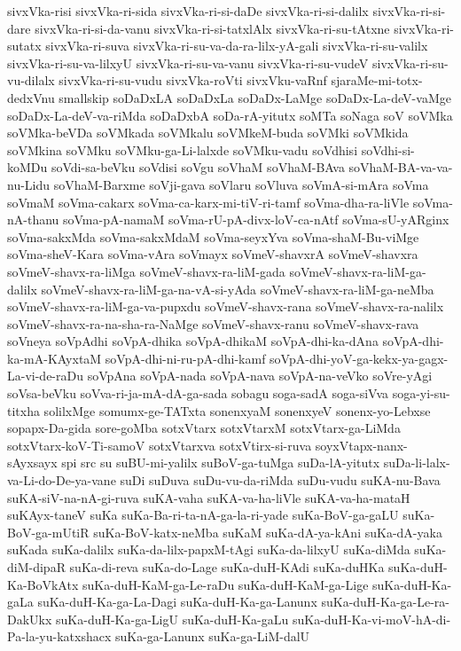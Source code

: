 {sivxVka-risi
sivxVka-ri-sida
sivxVka-ri-si-daDe
sivxVka-ri-si-dalilx
sivxVka-ri-si-dare
sivxVka-ri-si-da-vanu
sivxVka-ri-si-tatxlAlx
sivxVka-ri-su-tAtxne
sivxVka-ri-sutatx
sivxVka-ri-suva
sivxVka-ri-su-va-da-ra-lilx-yA-gali
sivxVka-ri-su-valilx
sivxVka-ri-su-va-lilxyU
sivxVka-ri-su-va-vanu
sivxVka-ri-su-vudeV
sivxVka-ri-su-vu-dilalx
sivxVka-ri-su-vudu
sivxVka-roVti
sivxVku-vaRnf
sjaraMe-mi-totx-dedxVnu
smallskip
soDaDxLA
soDaDxLa
soDaDx-LaMge
soDaDx-La-deV-vaMge
soDaDx-La-deV-va-riMda
soDaDxbA
soDa-rA-yitutx
soMTa
soNaga
soV
soVMka
soVMka-beVDa
soVMkada
soVMkalu
soVMkeM-buda
soVMki
soVMkida
soVMkina
soVMku
soVMku-ga-Li-lalxde
soVMku-vadu
soVdhisi
soVdhi-si-koMDu
soVdi-sa-beVku
soVdisi
soVgu
soVhaM
soVhaM-BAva
soVhaM-BA-va-va-nu-Lidu
soVhaM-Barxme
soVji-gava
soVlaru
soVluva
soVmA-si-mAra
soVma
soVmaM
soVma-cakarx
soVma-ca-karx-mi-tiV-ri-tamf
soVma-dha-ra-liVle
soVma-nA-thanu
soVma-pA-namaM
soVma-rU-pA-divx-loV-ca-nAtf
soVma-sU-yARginx
soVma-sakxMda
soVma-sakxMdaM
soVma-seyxYva
soVma-shaM-Bu-viMge
soVma-sheV-Kara
soVma-vAra
soVmayx
soVmeV-shavxrA
soVmeV-shavxra
soVmeV-shavx-ra-liMga
soVmeV-shavx-ra-liM-gada
soVmeV-shavx-ra-liM-ga-dalilx
soVmeV-shavx-ra-liM-ga-na-vA-si-yAda
soVmeV-shavx-ra-liM-ga-neMba
soVmeV-shavx-ra-liM-ga-va-pupxdu
soVmeV-shavx-rana
soVmeV-shavx-ra-nalilx
soVmeV-shavx-ra-na-sha-ra-NaMge
soVmeV-shavx-ranu
soVmeV-shavx-rava
soVneya
soVpAdhi
soVpA-dhika
soVpA-dhikaM
soVpA-dhi-ka-dAna
soVpA-dhi-ka-mA-KAyxtaM
soVpA-dhi-ni-ru-pA-dhi-kamf
soVpA-dhi-yoV-ga-kekx-ya-gagx-La-vi-de-raDu
soVpAna
soVpA-nada
soVpA-nava
soVpA-na-veVko
soVre-yAgi
soVsa-beVku
soVva-ri-ja-mA-dA-ga-sada
sobagu
soga-sadA
soga-siVva
soga-yi-su-titxha
solilxMge
somumx-ge-TATxta
sonenxyaM
sonenxyeV
sonenx-yo-Lebxse
sopapx-Da-gida
sore-goMba
sotxVtarx
sotxVtarxM
sotxVtarx-ga-LiMda
sotxVtarx-koV-Ti-samoV
sotxVtarxva
sotxVtirx-si-ruva
soyxVtapx-nanx-sAyxsayx
spi
src
su
suBU-mi-yalilx
suBoV-ga-tuMga
suDa-lA-yitutx
suDa-li-lalx-va-Li-do-De-ya-vane
suDi
suDuva
suDu-vu-da-riMda
suDu-vudu
suKA-nu-Bava
suKA-siV-na-nA-gi-ruva
suKA-vaha
suKA-va-ha-liVle
suKA-va-ha-mataH
suKAyx-taneV
suKa
suKa-Ba-ri-ta-nA-ga-la-ri-yade
suKa-BoV-ga-gaLU
suKa-BoV-ga-mUtiR
suKa-BoV-katx-neMba
suKaM
suKa-dA-ya-kAni
suKa-dA-yaka
suKada
suKa-dalilx
suKa-da-lilx-papxM-tAgi
suKa-da-lilxyU
suKa-diMda
suKa-diM-dipaR
suKa-di-reva
suKa-do-Lage
suKa-duH-KAdi
suKa-duHKa
suKa-duH-Ka-BoVkAtx
suKa-duH-KaM-ga-Le-raDu
suKa-duH-KaM-ga-Lige
suKa-duH-Ka-gaLa
suKa-duH-Ka-ga-La-Dagi
suKa-duH-Ka-ga-Lanunx
suKa-duH-Ka-ga-Le-ra-DakUkx
suKa-duH-Ka-ga-LigU
suKa-duH-Ka-gaLu
suKa-duH-Ka-vi-moV-hA-di-Pa-la-yu-katxshacx
suKa-ga-Lanunx
suKa-ga-LiM-dalU
}
